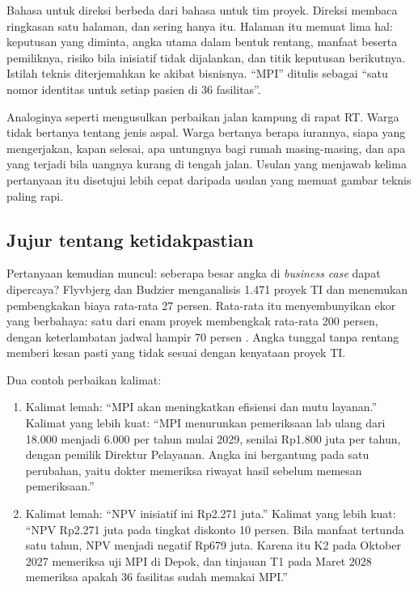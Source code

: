 Bahasa untuk direksi berbeda dari bahasa untuk tim proyek. Direksi membaca
ringkasan satu halaman, dan sering hanya itu. Halaman itu memuat lima hal:
keputusan yang diminta, angka utama dalam bentuk rentang, manfaat beserta
pemiliknya, risiko bila inisiatif tidak dijalankan, dan titik keputusan
berikutnya. Istilah teknis diterjemahkan ke akibat bisnisnya. ``MPI''
ditulis sebagai ``satu nomor identitas untuk setiap pasien di 36 fasilitas''.

Analoginya seperti mengusulkan perbaikan jalan kampung di rapat RT. Warga
tidak bertanya tentang jenis aspal. Warga bertanya berapa iurannya, siapa yang
mengerjakan, kapan selesai, apa untungnya bagi rumah masing-masing, dan apa
yang terjadi bila uangnya kurang di tengah jalan. Usulan yang menjawab kelima
pertanyaan itu disetujui lebih cepat daripada usulan yang memuat gambar
teknis paling rapi.

\subsection*{Jujur tentang ketidakpastian}

Pertanyaan kemudian muncul: seberapa besar angka di \textit{business case}
dapat dipercaya? Flyvbjerg dan Budzier menganalisis 1.471 proyek TI dan
menemukan pembengkakan biaya rata-rata 27 persen. Rata-rata itu
menyembunyikan ekor yang berbahaya: satu dari enam proyek membengkak
rata-rata 200 persen, dengan keterlambatan jadwal hampir 70 persen
\cite{flyvbjerg2011}. Angka tunggal tanpa rentang memberi kesan pasti
yang tidak sesuai dengan kenyataan proyek TI.

Dua contoh perbaikan kalimat:

\begin{enumerate}
  \item Kalimat lemah: ``MPI akan meningkatkan efisiensi dan mutu layanan.''
        Kalimat yang lebih kuat: ``MPI menurunkan pemeriksaan lab ulang dari
        18.000 menjadi 6.000 per tahun mulai 2029, senilai Rp1.800 juta per
        tahun, dengan pemilik Direktur Pelayanan. Angka ini bergantung
        pada satu perubahan, yaitu dokter memeriksa riwayat hasil sebelum
        memesan pemeriksaan.''
  \item Kalimat lemah: ``NPV inisiatif ini Rp2.271 juta.'' Kalimat yang lebih
        kuat: ``NPV Rp2.271 juta pada tingkat diskonto 10 persen. Bila
        manfaat tertunda satu tahun, NPV menjadi negatif Rp679 juta. Karena
        itu K2 pada Oktober 2027 memeriksa uji MPI di Depok, dan tinjauan T1
        pada Maret 2028 memeriksa apakah 36 fasilitas sudah memakai MPI.''
\end{enumerate}

